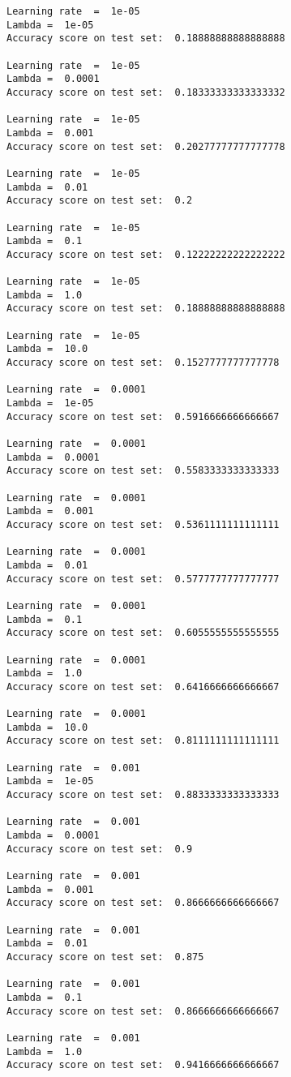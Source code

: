 \documentclass[11pt]{article}
\begin{document}
    \begin{Verbatim}[commandchars=\\\{\}]
Learning rate  =  1e-05
Lambda =  1e-05
Accuracy score on test set:  0.18888888888888888

Learning rate  =  1e-05
Lambda =  0.0001
Accuracy score on test set:  0.18333333333333332

Learning rate  =  1e-05
Lambda =  0.001
Accuracy score on test set:  0.20277777777777778

Learning rate  =  1e-05
Lambda =  0.01
Accuracy score on test set:  0.2

Learning rate  =  1e-05
Lambda =  0.1
Accuracy score on test set:  0.12222222222222222

Learning rate  =  1e-05
Lambda =  1.0
Accuracy score on test set:  0.18888888888888888

Learning rate  =  1e-05
Lambda =  10.0
Accuracy score on test set:  0.1527777777777778

Learning rate  =  0.0001
Lambda =  1e-05
Accuracy score on test set:  0.5916666666666667

Learning rate  =  0.0001
Lambda =  0.0001
Accuracy score on test set:  0.5583333333333333

Learning rate  =  0.0001
Lambda =  0.001
Accuracy score on test set:  0.5361111111111111

Learning rate  =  0.0001
Lambda =  0.01
Accuracy score on test set:  0.5777777777777777

Learning rate  =  0.0001
Lambda =  0.1
Accuracy score on test set:  0.6055555555555555

Learning rate  =  0.0001
Lambda =  1.0
Accuracy score on test set:  0.6416666666666667

Learning rate  =  0.0001
Lambda =  10.0
Accuracy score on test set:  0.8111111111111111

Learning rate  =  0.001
Lambda =  1e-05
Accuracy score on test set:  0.8833333333333333

Learning rate  =  0.001
Lambda =  0.0001
Accuracy score on test set:  0.9

Learning rate  =  0.001
Lambda =  0.001
Accuracy score on test set:  0.8666666666666667

Learning rate  =  0.001
Lambda =  0.01
Accuracy score on test set:  0.875

Learning rate  =  0.001
Lambda =  0.1
Accuracy score on test set:  0.8666666666666667

Learning rate  =  0.001
Lambda =  1.0
Accuracy score on test set:  0.9416666666666667


\end{Verbatim}
\end{document}

